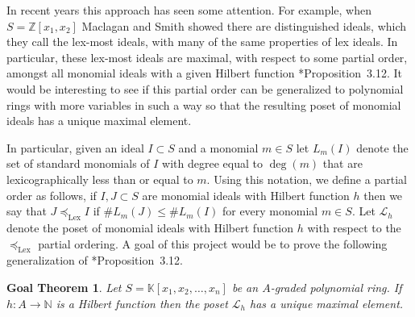 \documentclass[11pt,reqno]{amsart}
\newtheorem{goalTheorem}[lemma]{Goal Theorem}
\newtheorem{problem}[lemma]{Research Problem}
\theoremstyle{remark}
\newcommand{\cL}{\mathcal{L}}
\newcommand{\K}{\mathbb{K}}
\newcommand{\N}{\mathbb{N}}
\newcommand{\Z}{\mathbb{Z}}
\begin{document}
%


In recent years this approach has seen some attention. For example, when $S=\Z[x_{1},x_{2}]$ Maclagan and Smith showed there are distinguished ideals, which they call the lex-most ideals, with many of the same properties of lex ideals. In particular, these lex-most ideals are maximal, with respect to some partial order, amongst all monomial ideals with a given Hilbert function \cite{maclaganSmith10}*{Proposition~3.12}. It would be interesting to see if this partial order can be generalized to polynomial rings with more variables in such a way so that the resulting poset of monomial ideals has a unique maximal element.

In particular, given an ideal $I\subset S$ and a monomial $m\in S$ let $L_{m}(I)$ denote the set of standard monomials of $I$ with degree equal to $\deg(m)$ that are lexicographically less than or equal to $m$. Using this notation, we define a partial order as follows, if $I,J\subset S$ are monomial ideals with Hilbert function $h$ then we say that $J\preceq_{\text{Lex}} I$ if $\#L_{m}(J) \leq \#L_{m}(I)$ for every monomial $m\in S$. Let $\cL_{h}$ denote the poset of monomial ideals with Hilbert function $h$ with respect to the $\preceq_{\text{Lex}}$ partial ordering. A goal of this project would be to prove the following generalization of \cite{maclaganSmith10}*{Proposition~3.12}. 

\begin{goalTheorem}\label{goalThm:hilbfun}
	Let $S=\K[x_{1},x_{2},\ldots,x_{n}]$ be an $A$-graded polynomial ring. If $h:A\to \N$ is a Hilbert function then the poset $\cL_{h}$ has a unique maximal element. 
\end{goalTheorem}
\end{document}
